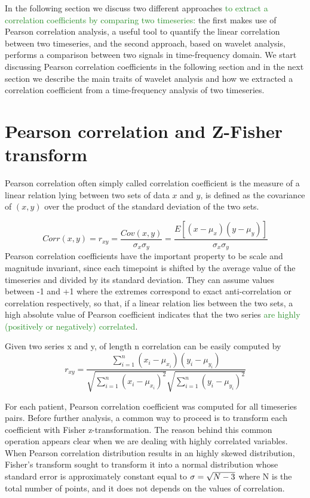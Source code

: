 \documentclass[11pt]{report}
\begin{document}
In the following section we discuss two different approaches \textcolor{ForestGreen}{to extract a correlation coefficients by comparing two timeseries:} the first makes use of Pearson correlation analysis, a useful tool to quantify the linear correlation between two timeseries, and the second approach, based on wavelet analysis, performs a comparison between two signals in time-frequency domain.
We start discussing Pearson correlation coefficients in the following section and in the next section we describe the main traits of wavelet analysis and how we extracted a correlation coefficient from a time-frequency analysis of two timeseries.

\section{Pearson correlation and Z-Fisher transform}
Pearson correlation often simply called correlation coefficient is the measure of a linear relation lying between two sets of data $x$ and $y$, is defined as the covariance of $(x, y)$ over the product of the standard deviation of the two sets.

\begin{equation}
Corr(x, y) = r_{xy}=  \frac{Cov\left( x, y\right)}{\sigma_x \sigma_y} = \frac{E\left[ \left( x - \mu_x \right) \left( y - \mu_y \right)\right]}{\sigma_{x} \sigma_{y}}
\end{equation}
Pearson correlation coefficients have the important property to be scale and magnitude invariant, since each timepoint is shifted by the average value of the timeseries and divided by its standard deviation.
They can assume values between -1 and +1 where the extremes correspond to exact anti-correlation or correlation respectively, so that, if a linear relation lies between the two sets, a high absolute value of Pearson coefficient indicates that the two series \textcolor{ForestGreen}{are highly  (positively or negatively) correlated}.
\cite{baldini2021}

Given two series x and y, of length n correlation can be easily computed by
\begin{equation}
r_{xy} = \frac{\sum_{i = 1}^n \left( x_i - \mu_{x_i}\right)\left( y_i - \mu_{y_i}\right)}{\sqrt{\sum_{i = 1}^n \left( x_i -\mu_{x_i}\right)^2}\sqrt{\sum_{i = 1}^n \left( y_i -\mu_{y_i}\right)^2}}
\end{equation}

For each patient, Pearson correlation coefficient was computed for all timeseries pairs.
Before further analysis, a common way to proceed is to transform each coefficient with Fisher z-transformation.\cite{spera-2019}
The reason behind this common operation appears clear when we are dealing with highly correlated variables.
When Pearson correlation distribution results in an highly skewed distribution, Fisher's transform sought to transform it into a normal distribution whose standard error is approximately constant equal to $\sigma = \/\sqrt{N-3}$ where N is the total number of points, and it does not depends on the values of correlation.\cite{wicklin2017}
\end{document}
